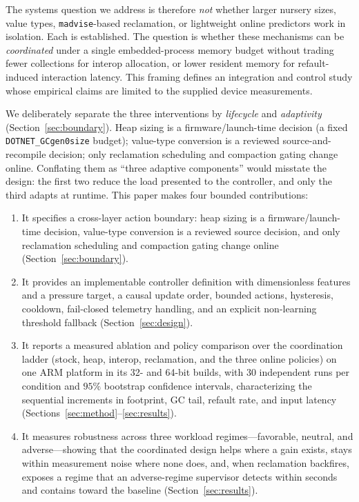 The systems question we address is therefore \emph{not} whether larger
nursery sizes, value types, \texttt{madvise}-based reclamation, or
lightweight online predictors work in isolation. Each is established. The
question is whether these mechanisms can be \emph{coordinated} under a
single embedded-process memory budget without trading fewer collections
for interop allocation, or lower resident memory for refault-induced
interaction latency. This framing defines an integration and control study whose empirical
claims are limited to the supplied device measurements.

We deliberately separate the three interventions by \emph{lifecycle} and
\emph{adaptivity} (Section~\ref{sec:boundary}). Heap sizing is a
firmware/launch-time decision (a fixed \texttt{DOTNET\_GCgen0size} budget);
value-type conversion is a reviewed source-and-recompile decision; only
reclamation scheduling and compaction gating change online. Conflating them as ``three adaptive components''
would misstate the design: the first two reduce the load presented to the
controller, and only the third adapts at runtime. This paper makes four bounded
contributions:
\begin{enumerate}
  \item It specifies a cross-layer action boundary: heap sizing is a
  firmware/launch-time decision, value-type conversion is a reviewed source
  decision, and only reclamation scheduling and compaction gating change
  online (Section~\ref{sec:boundary}).
  \item It provides an implementable controller definition with
  dimensionless features and a pressure target, a causal update order, bounded
  actions, hysteresis, cooldown, fail-closed telemetry handling, and an
  explicit non-learning threshold fallback (Section~\ref{sec:design}).
  \item It reports a measured ablation and policy comparison over the
  coordination ladder (stock, heap, interop, reclamation, and the three online
  policies) on one ARM platform in its 32- and 64-bit builds, with $30$
  independent runs per condition and $95\%$ bootstrap confidence intervals,
  characterizing the
  sequential increments in footprint, GC tail, refault rate, and input latency
  (Sections~\ref{sec:method}--\ref{sec:results}).
  \item It measures robustness across three workload regimes---favorable,
  neutral, and adverse---showing that the coordinated design helps where a gain
  exists, stays within measurement noise where none does, and, when
  reclamation backfires, exposes a regime that an adverse-regime supervisor
  detects within seconds and contains toward the baseline
  (Section~\ref{sec:results}).
\end{enumerate}

